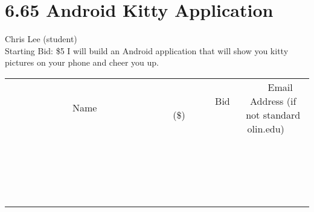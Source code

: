 \documentclass[11pt]{article}
\begin{document}
\section*{6.65 Android Kitty Application}
Chris Lee (student)
\\
Starting Bid: \$5
\newline
I will build an Android application that will show you kitty pictures on your phone and cheer you up.
\\[3ex]
\begin{tabular}{c c c}
~~~~~~~~~~~~~Name~~~~~~~~~~~~~ & ~~~~~~~~~Bid (\$)~~~~~~~~~  & ~~~Email Address (if not standard olin.edu)~~~\\
 & & \\
\hline
 & & \\
\hline
 & & \\
\hline
 & & \\
\hline
 & & \\
\hline
 & & \\
\hline
 & & \\
\hline
 & & \\
\hline
 & & \\
\hline
 & & \\
\hline
 & & \\
\hline
 & & \\
\hline
 & & \\
\hline
 & & \\
\hline
 & & \\
\hline
 & & \\
\hline
 & & \\
\hline
 & & \\
\hline
 & & \\
\hline
\end{tabular}
\newpage
\end{document}
